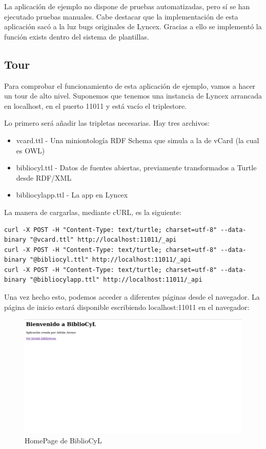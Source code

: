 \documentclass[12pt]{report} %
\begin{document}
La aplicación de ejemplo no dispone de pruebas automatizadas, pero sí se han ejecutado pruebas manuales. Cabe destacar que la implementación de esta aplicación sacó a la luz bugs originales de Lyncex. Gracias a ello se implementó la función exists dentro del sistema de plantillas.

\subsection{Tour}

Para comprobar el funcionamiento de esta aplicación de ejemplo, vamos a hacer un tour de alto nivel. Suponemos que tenemos una instancia de Lyncex arrancada en localhost, en el puerto 11011 y está vacío el triplestore.

Lo primero será añadir las tripletas necesarias. Hay tres archivos:
\begin{itemize}
    \item vcard.ttl - Una miniontología RDF Schema que simula a la de vCard (la cual es OWL)
    \item bibliocyl.ttl - Datos de fuentes abiertas, previamente transformados a Turtle desde RDF/XML
    \item bibliocylapp.ttl - La app en Lyncex
\end{itemize}

La manera de cargarlas, mediante cURL, es la siguiente:
\begin{verbatim}
curl -X POST -H "Content-Type: text/turtle; charset=utf-8" --data-binary "@vcard.ttl" http://localhost:11011/_api
curl -X POST -H "Content-Type: text/turtle; charset=utf-8" --data-binary "@bibliocyl.ttl" http://localhost:11011/_api
curl -X POST -H "Content-Type: text/turtle; charset=utf-8" --data-binary "@bibliocylapp.ttl" http://localhost:11011/_api
\end{verbatim}

Una vez hecho esto, podemos acceder a diferentes páginas desde el navegador. La página de inicio estará disponible escribiendo localhost:11011 en el navegador:
\begin{figure}
    \centering
    \includegraphics[width=\textwidth]{tour/bibliocyl1.png}
    \caption{HomePage de BiblioCyL}
    \label{fig:bibliocyl1}
\end{figure}
\end{document}
